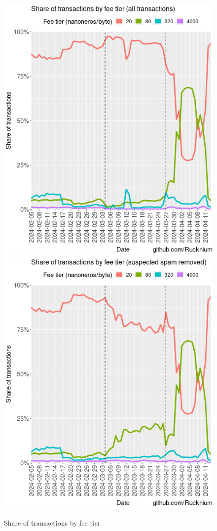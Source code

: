 \documentclass[usletter,11pt,english,openany]{article}
\begin{document}
\begin{figure}[H]
\caption{Share of transactions by fee tier}
\label{fig-share-tx-by-fee-tier}
\centering{}\includegraphics[scale=0.5]{images/share-tx-in-fee-tier-all-txs}\includegraphics[scale=0.5]{images/share-tx-in-fee-tier-spam-removed}
\end{figure}
\end{document}
